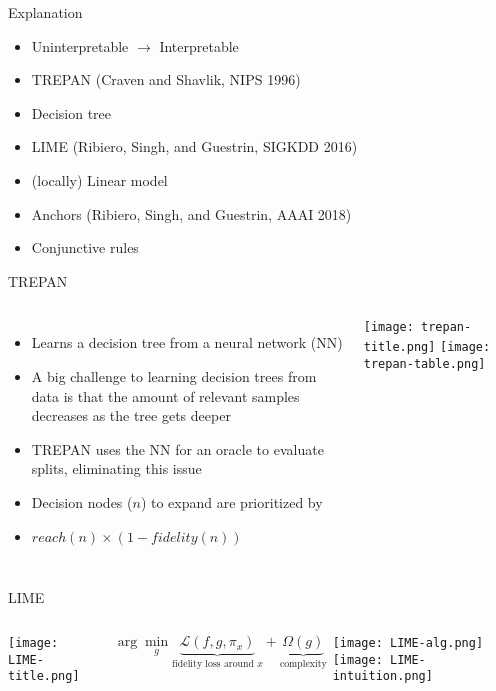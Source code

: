 \documentclass[aspectratio=169]{beamer}
\begin{document}

\begin{frame}{Explanation}
\begin{itemize}[<+->]
	\item Uninterpretable $\rightarrow$ Interpretable
	\item TREPAN (Craven and Shavlik, NIPS 1996)
	\item[] Decision tree
	\item LIME (Ribiero, Singh, and Guestrin, SIGKDD 2016)
	\item[] (locally) Linear model
	\item Anchors (Ribiero, Singh, and Guestrin, AAAI 2018)
	\item[] Conjunctive rules
\end{itemize}

\end{frame}


\begin{frame}{TREPAN}
\begin{columns}
	\begin{itemize}[<+->]
		\item Learns a decision tree from a neural network (NN)
		\item A big challenge to learning decision trees from data is that the amount of relevant samples decreases as the tree gets deeper
		\item TREPAN uses the NN for an oracle to evaluate splits, eliminating this issue
		\item Decision nodes ($n$) to expand are prioritized by
		\item[] $\mathit{reach}( n ) \times (1 - \mathit{fidelity}(n) )$
	\end{itemize}
	\column{6cm}
	\texttt{[image: trepan-title.png]}
	\texttt{[image: trepan-table.png]}
\end{columns}
\end{frame}


\begin{frame}{LIME}
\begin{columns}
	 \centering
	\texttt{[image: LIME-title.png]}
	
	{\color{UWRed}
	\[
	\arg \min_g \underbrace{ \mathcal L ( f, g, \pi_x ) }_{\text{fidelity loss around }x} + \underbrace{ \Omega( g ) }_\text{complexity}
	\]}
	
	\texttt{[image: LIME-alg.png]}
	 \centering
	\texttt{[image: LIME-intuition.png]}
\end{columns}
\end{frame}
\end{document}
